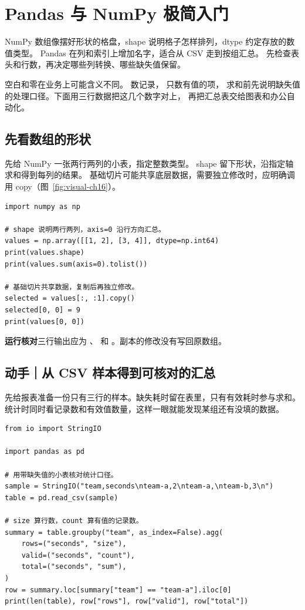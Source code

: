 \documentclass[UTF8,a4paper,oneside,openany,fontset=none,11pt]{ctexbook}
\newcommand{\code}[1]{\texttt{\detokenize{#1}}}
\begin{document}
\section{Pandas 与 NumPy 极简入门}

NumPy 数组像摆好形状的格盘，shape 说明格子怎样排列，dtype 约定存放的数值类型。
Pandas 在列和索引上增加名字，适合从 CSV 走到按组汇总。
先检查表头和行数，再决定哪些列转换、哪些缺失值保留。

空白和零在业务上可能含义不同。\code{size} 数记录，\code{count} 只数有值的项，
求和前先说明缺失值的处理口径。下面用三行数据把这几个数字对上，
再把汇总表交给图表和办公自动化。

\subsection*{先看数组的形状}

先给 NumPy 一张两行两列的小表，指定整数类型。
shape 留下形状，沿指定轴求和得到每列的结果。
基础切片可能共享底层数据，需要独立修改时，应明确调用 copy（图~\ref{fig:visual-ch16}）。


\begin{lstlisting}[title={\code{array_shape.py}}]
import numpy as np

# shape 说明两行两列，axis=0 沿行方向汇总。
values = np.array([[1, 2], [3, 4]], dtype=np.int64)
print(values.shape)
print(values.sum(axis=0).tolist())

# 基础切片共享数据，复制后再独立修改。
selected = values[:, :1].copy()
selected[0, 0] = 9
print(values[0, 0])
\end{lstlisting}


\textbf{运行核对}\enspace 三行输出应为 \code{(2, 2)}、
\code{[4, 6]} 和 \code{1}。副本的修改没有写回原数组。

\subsection*{动手｜从 CSV 样本得到可核对的汇总}

先给报表准备一份只有三行的样本。缺失耗时留在表里，只有有效耗时参与求和。统计时同时看记录数和有效值数量，这样一眼就能发现某组还有没填的数据。

\begin{lstlisting}[title={\code{sync_summary.py}}]
from io import StringIO

import pandas as pd

# 用带缺失值的小表核对统计口径。
sample = StringIO("team,seconds\nteam-a,2\nteam-a,\nteam-b,3\n")
table = pd.read_csv(sample)

# size 算行数，count 算有值的记录数。
summary = table.groupby("team", as_index=False).agg(
    rows=("seconds", "size"),
    valid=("seconds", "count"),
    total=("seconds", "sum"),
)
row = summary.loc[summary["team"] == "team-a"].iloc[0]
print(len(table), row["rows"], row["valid"], row["total"])
\end{lstlisting}
\end{document}
